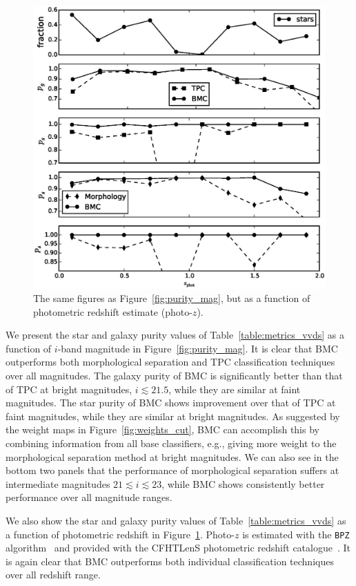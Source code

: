 \documentclass[useAMS,usenatbib]{mn2e}
\newcommand{\eg}{{e.g., }}
\begin{document}
\begin{figure}
\begin{minipage}[t]{0.49\linewidth}
    \includegraphics[width=\textwidth]{figures/purity_z.eps}
    \caption{The same figures as Figure~\ref{fig:purity_mag},
             but as a function of photometric redshift estimate
             (photo-$z$).}
    \label{fig:purity_z}
  \end{minipage}
\end{figure}

We present the star and galaxy purity values
of Table~\ref{table:metrics_vvds} as a function of
$i$-band magnitude in Figure~\ref{fig:purity_mag}.
It is clear that BMC outperforms both
morphological separation and TPC classification techniques
over all magnitudes.
The galaxy purity of BMC is significantly better
than that of TPC at bright magnitudes, $i\lesssim21.5$,
while they are similar at faint magnitudes.
The star purity of BMC shows improvement over that of TPC
at faint magnitudes,
while they are similar at bright magnitudes.
As suggested by the weight maps in Figure~\ref{fig:weights_cut},
BMC can accomplish this by combining information from
all base classifiers,
\eg giving more weight to the morphological separation method
at bright magnitudes.
We can also see in the bottom two panels that
the performance of morphological separation suffers
at intermediate magnitudes $21\lesssim i \lesssim23$,
while BMC shows consistently better performance
over all magnitude ranges.


We also show the star and galaxy purity values
of Table~\ref{table:metrics_vvds} as a function of
photometric redshift in Figure~\ref{fig:purity_z}.
Photo-$z$ is estimated with
the \texttt{BPZ} algorithm~\citep{benitez2000bayesian}
and provided with
the CFHTLenS photometric redshift catalogue~\citep{Hildebrandt2012}.
It is again clear that BMC outperforms
both individual classification techniques over all redshift range.
\end{document}
